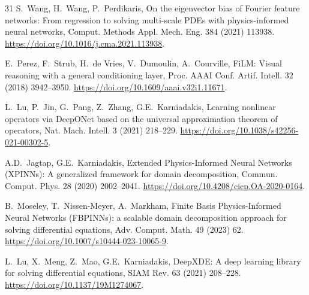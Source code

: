 \documentclass[3p,preprint,12pt,numbers,square,sort&compress]{elsarticle}
\begin{document}
\begin{thebibliography}{31}
S.~Wang, H.~Wang, P.~Perdikaris, On the eigenvector bias of Fourier feature networks: From regression to solving multi-scale PDEs with physics-informed neural networks, Comput. Methods Appl. Mech. Eng. 384 (2021) 113938. \href{https://doi.org/10.1016/j.cma.2021.113938}{https://doi.org/10.1016/j.cma.2021.113938}.

E.~Perez, F.~Strub, H.~de Vries, V.~Dumoulin, A.~Courville, FiLM: Visual reasoning with a general conditioning layer, Proc. AAAI Conf. Artif. Intell. 32 (2018) 3942--3950. \href{https://doi.org/10.1609/aaai.v32i1.11671}{https://doi.org/10.1609/aaai.v32i1.11671}.

L.~Lu, P.~Jin, G.~Pang, Z.~Zhang, G.E.~Karniadakis, Learning nonlinear operators via DeepONet based on the universal approximation theorem of operators, Nat. Mach. Intell. 3 (2021) 218--229. \href{https://doi.org/10.1038/s42256-021-00302-5}{https://doi.org/10.1038/s42256-021-00302-5}.

A.D.~Jagtap, G.E.~Karniadakis, Extended Physics-Informed Neural Networks (XPINNs): A generalized framework for domain decomposition, Commun. Comput. Phys. 28 (2020) 2002--2041. \href{https://doi.org/10.4208/cicp.OA-2020-0164}{https://doi.org/10.4208/cicp.OA-2020-0164}.

B.~Moseley, T.~Nissen-Meyer, A.~Markham, Finite Basis Physics-Informed Neural Networks (FBPINNs): a scalable domain decomposition approach for solving differential equations, Adv. Comput. Math. 49 (2023) 62. \href{https://doi.org/10.1007/s10444-023-10065-9}{https://doi.org/10.1007/s10444-023-10065-9}.

L.~Lu, X.~Meng, Z.~Mao, G.E.~Karniadakis, DeepXDE: A deep learning library for solving differential equations, SIAM Rev. 63 (2021) 208--228. \href{https://doi.org/10.1137/19M1274067}{https://doi.org/10.1137/19M1274067}.

\end{thebibliography}
\end{document}
